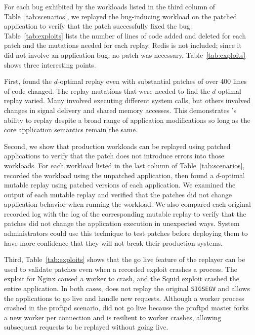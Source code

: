 For each bug exhibited by the workloads listed in the third column of
Table~\ref{tab:scenarios}, we replayed the
bug-inducing workload on the patched application to verify
that the patch successfully fixed the bug. Table~\ref{tab:exploits}
lists the number of lines of code added and deleted for each patch and the
mutations needed for each replay.
Redis is not included; since it did not involve an application bug, no
patch was necessary. Table~\ref{tab:exploits} shows three interesting points.

First, {\dora} found the $d$-optimal replay
even with substantial patches of
over 400 lines of code changed. The replay mutations
that were needed to find the $d$-optimal replay varied. Many involved
executing different system calls, but others involved changes in
signal delivery and shared memory accesses. This demonstrates
{\dora}'s ability to replay despite a broad range of application
modifications so long as the core application semantics remain the
same.

Second, we show that production workloads can be replayed using patched
applications to verify that the patch does not introduce errors
into those workloads.
For each workload listed in the last column of Table~\ref{tab:scenarios},
{\dora} recorded the workload using the unpatched application, then found a
$d$-optimal mutable replay using patched versions of each application.  We
examined the output of each mutable replay and verified that the patches did not
change application behavior when running the workload.  We also compared each
original recorded log with the log of the corresponding mutable replay to verify
that the patches did not change the application execution in unexpected ways.
System administrators could use this technique to test patches before deploying
them to have more confidence that they will not break their production systems.

Third, Table~\ref{tab:exploits} shows that the go live feature of the replayer
can be used to validate patches even when a recorded exploit crashes a process.
The exploit for Nginx caused a worker to crash, and the Squid exploit crashed the
entire application.
In both cases, {\dora} does not replay
the original {\tt SIGSEGV} and allows the applications to go live
and handle new requests. Although a worker process crashed in the proftpd
scenario, {\dora} did not go live because the
proftpd master forks a new worker per connection and is resilient to worker
crashes, allowing subsequent requests to be replayed without going live.

